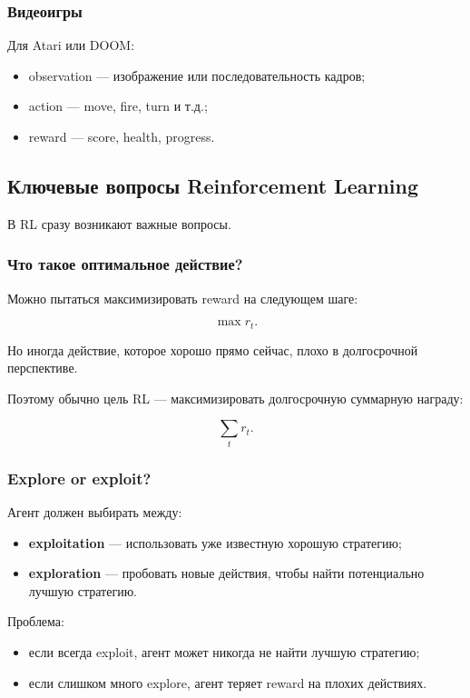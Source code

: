 \documentclass[a4paper,12pt]{article}
\begin{document}
\subsubsection{Видеоигры}

Для Atari или DOOM:

\begin{itemize}
    \item observation --- изображение или последовательность кадров;
    \item action --- move, fire, turn и т.д.;
    \item reward --- score, health, progress.
\end{itemize}

\subsection{Ключевые вопросы Reinforcement Learning}

В RL сразу возникают важные вопросы.

\subsubsection{Что такое оптимальное действие?}

Можно пытаться максимизировать reward на следующем шаге:

\[
\max r_t.
\]

Но иногда действие, которое хорошо прямо сейчас, плохо в долгосрочной перспективе.

Поэтому обычно цель RL --- максимизировать долгосрочную суммарную награду:

\[
\sum_t r_t.
\]

\subsubsection{Explore or exploit?}

Агент должен выбирать между:

\begin{itemize}
    \item \textbf{exploitation} --- использовать уже известную хорошую стратегию;
    \item \textbf{exploration} --- пробовать новые действия, чтобы найти потенциально лучшую стратегию.
\end{itemize}

Проблема:

\begin{itemize}
    \item если всегда exploit, агент может никогда не найти лучшую стратегию;
    \item если слишком много explore, агент теряет reward на плохих действиях.
\end{itemize}
\end{document}
